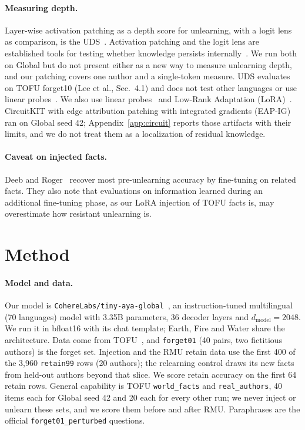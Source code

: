 \documentclass[10pt,twocolumn]{article}
\newcommand{\code}[1]{\texttt{#1}}
\begin{document}
\paragraph{Measuring depth.} Layer-wise activation patching as a depth score for unlearning, with a logit lens as comparison, is the UDS~\cite{lee2026uds}. Activation patching and the logit lens are established tools for testing whether knowledge persists internally~\cite{zhang2023patching,belrose2023tuned}. We run both on Global but do not present either as a new way to measure unlearning depth, and our patching covers one author and a single-token measure. UDS evaluates on TOFU forget10 (Lee et al., Sec.~4.1) and does not test other languages or use linear probes~\cite{lee2026uds}. We also use linear probes~\cite{alain2016probes} and Low-Rank Adaptation (LoRA)~\cite{hu2021lora}. CircuitKIT with edge attribution patching with integrated gradients (EAP-IG)~\cite{hanna2024faith,syed2023attribution} ran on Global seed 42; Appendix~\ref{app:circuit} reports those artifacts with their limits, and we do not treat them as a localization of residual knowledge.

\paragraph{Caveat on injected facts.} Deeb and Roger~\cite{deeb2024unlearning} recover most pre-unlearning accuracy by fine-tuning on related facts. They also note that evaluations on information learned during an additional fine-tuning phase, as our LoRA injection of TOFU facts is, may overestimate how resistant unlearning is.

\section{Method}
\label{sec:method}
\paragraph{Model and data.} Our model is \code{CohereLabs/\allowbreak tiny-aya-global}~\cite{salamanca2026tinyaya}, an instruction-tuned multilingual (70 languages) model with 3.35B parameters, 36 decoder layers and $d_\text{model}=2048$. We run it in bfloat16 with its chat template; Earth, Fire and Water share the architecture. Data come from TOFU~\cite{maini2024tofu}, and \code{forget01} (40 pairs, two fictitious authors) is the forget set. Injection and the RMU retain data use the first 400 of the 3{,}960 \code{retain99} rows (20 authors); the relearning control draws its new facts from held-out authors beyond that slice. We score retain accuracy on the first 64 retain rows. General capability is TOFU \code{world\_facts} and \code{real\_authors}, 40 items each for Global seed 42 and 20 each for every other run; we never inject or unlearn these sets, and we score them before and after RMU. Paraphrases are the official \code{forget01\_perturbed} questions.
\end{document}
